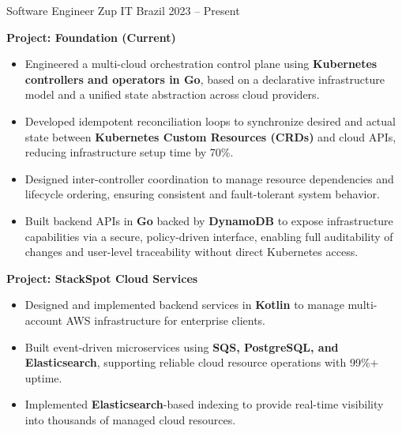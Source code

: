 
\begin{cventries}


	\cventry
	{Software Engineer}
	{Zup IT}
	{Brazil}
	{2023 -- Present}
	{
		\begin{cvitems}
			\item \textbf{Project: Foundation (Current)}
			\begin{itemize}
				\item Engineered a multi-cloud orchestration control plane using \textbf{Kubernetes controllers and operators in Go}, based on a declarative infrastructure model and a unified state abstraction across cloud providers.
				\item Developed idempotent reconciliation loops to synchronize desired and actual state between \textbf{Kubernetes Custom Resources (CRDs)} and cloud APIs, reducing infrastructure setup time by 70\%.
				\item Designed inter-controller coordination to manage resource dependencies and lifecycle ordering, ensuring consistent and fault-tolerant system behavior.
				\item Built backend APIs in \textbf{Go} backed by \textbf{DynamoDB} to expose infrastructure capabilities via a secure, policy-driven interface, enabling full auditability of changes and user-level traceability without direct Kubernetes access.
			\end{itemize}
			\item \textbf{Project: StackSpot Cloud Services}
			\begin{itemize}
				\item Designed and implemented backend services in \textbf{Kotlin} to manage multi-account AWS infrastructure for enterprise clients.
				\item Built event-driven microservices using \textbf{SQS, PostgreSQL, and Elasticsearch}, supporting reliable cloud resource operations with 99\%+ uptime.
				\item Implemented \textbf{Elasticsearch}-based indexing to provide real-time visibility into thousands of managed cloud resources.
			\end{itemize}
		\end{cvitems}
	}
	

\end{cventries}
